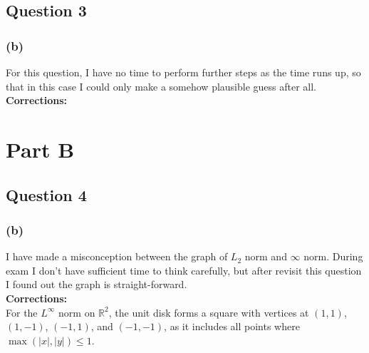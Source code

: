\documentclass[12pt]{article}
\begin{document}
\subsection*{Question 3}

\subsubsection{(b)}
For this question, I have no time to perform further steps as the time runs up, so that in this case I could only make a somehow plausible guess after all.
\\
\textbf{Corrections: }
\\

\section{Part B}

\subsection*{Question 4}

\subsubsection{(b)}
I have made a misconception between the graph of $L_2$ norm and $\infty$ norm. During exam I don't have sufficient time to think carefully, but after revisit this question I found out the graph is straight-forward.
\\
\textbf{Corrections: }
\\
For the \( L^\infty \) norm on \( \mathbb{R}^2 \), the unit disk forms a square with vertices at \( (1, 1) \), \( (1, -1) \), \( (-1, 1) \), and \( (-1, -1) \), as it includes all points where \( \max(|x|, |y|) \leq 1 \). 
\\
\end{document}
